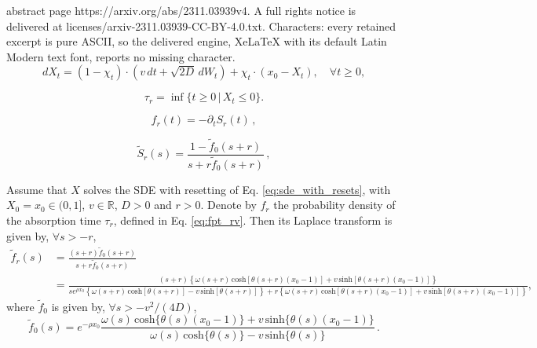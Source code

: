 \documentclass[10pt,a4paper]{amsart}
\begin{document}
abstract page https://arxiv.org/abs/2311.03939v4. A full rights notice is delivered at licenses/arxiv-2311.03939-CC-BY-4.0.txt. Characters: every retained excerpt is pure ASCII, so the delivered engine, XeLaTeX with its default Latin Modern text font, reports no missing character.
\begin{equation} \label{eq:sde_with_resets}
	dX_t=(1-\chi_t) \cdot (v\,dt+\sqrt{2D}\,dW_t) +\chi_t \cdot (x_0-X_t),\quad \forall t\geq 0,
\end{equation}

\begin{equation}\label{eq:fpt_rv}
	\tau_r=\inf\{t\geq 0\, | \, X_t\leq0\}.
\end{equation}

\begin{equation}
\label{eq:kr}
	f_r(t)=-\partial_t{S}_r(t)\,,
\end{equation} 

\begin{equation} \label{eq:tildeSr}
	\tilde{S}_r(s)
	=\frac{1-\tilde{f}_0(s+r)}{s+r\tilde{f}_0(s+r)}\,,
\end{equation}

\begin{proposition} \label{prop:laplaceres}
    Assume that $X$ solves the SDE with resetting of Eq. \eqref{eq:sde_with_resets}, with $X_0 = x_0 \in (0,1]$, $v \in \mathbb R$, $D>0$ and $r>0$. 
    Denote by $f_r$ the probability density of the absorption time $\tau_r$, defined in Eq. \eqref{eq:fpt_rv}. Then its Laplace transform is given by, $\forall s >-r$,
    \begin{align} \label{eq:tildef}
\tilde{f}_r(s) &
    = \frac{(s+r)\tilde{f}_0(s+r)}{s+r\tilde{f}_0(s+r)} \nonumber \\
    & 
    {\textstyle
    =\frac{(s+r) \left\{ \omega(s+r) \, \mathrm{cosh}[\theta(s+r)(x_0-1)]+v \, \mathrm{sinh}[\theta(s+r)(x_0-1)]\right\}}
    {s e^{\rho x_0}\left\{ \omega(s+r) \, \mathrm{cosh}[\theta(s+r)]-v \, \mathrm{sinh}[\theta(s+r)] \right\}
    + r \left\{ \omega(s+r) \, \mathrm{cosh}[\theta(s+r)(x_0-1)]+v \, \mathrm{sinh}[\theta(s+r)(x_0-1)] \right\} }},
\end{align}
where $\tilde{f}_0$ is given by, $\forall s> -v^2/(4D)$,
\begin{equation} \label{eq:tildef0}
	\tilde{f}_0(s)=
	e^{-\rho x_0}\frac{\omega(s) \, \mathrm{cosh}\{\theta(s)(x_0-1)\}+v \, \mathrm{sinh}\{\theta(s)(x_0-1)\}}
	{\omega(s) \, \mathrm{cosh}\{\theta(s)\}-v \, \mathrm{sinh}\{\theta(s)\}}\,.
\end{equation}
\end{proposition}
\end{document}
